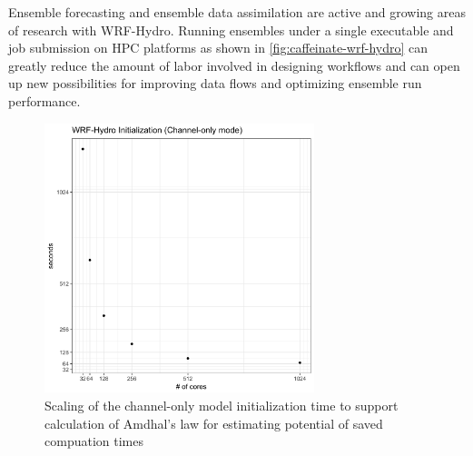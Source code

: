 Ensemble forecasting and ensemble data assimilation are active and
growing areas of research with WRF-Hydro. Running ensembles under a
single executable and job submission on HPC platforms as shown in
\ref{fig:caffeinate-wrf-hydro} can greatly reduce the amount
of labor involved in designing workflows and can open up new
possibilities for improving data flows and optimizing ensemble run
performance.

\begin{figure}
\includegraphics[width=0.7\textwidth]{figures/init_timing_linear.png}
\vspace{-7pt}
\caption{Scaling of the channel-only model initialization time to
  support calculation of Amdhal's law for estimating potential of
  saved compuation times \label{fig:wrf-hydro-init-scaling}}
\end{figure}

